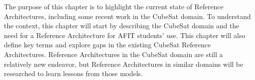 The purpose of this chapter is to highlight the current state of Reference Architectures, including some recent work in the CubeSat domain. To understand the context, this chapter will start by describing the CubeSat domain and the need for a Reference Architecture for AFIT students' use. This chapter will also define key terms and explore gaps in the existing CubeSat Reference Architectures. Reference Architectures in the CubeSat domain are still a relatively new endeavor, but Reference Architectures in similar domains will be researched to learn lessons from those models. 
